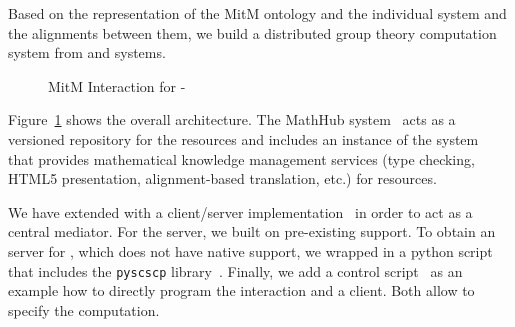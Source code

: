 Based on the \OMMT representation of the MitM ontology and the individual system and the alignments between them, we build a distributed group theory computation system from \GAP and \Singular systems.

\begin{figure}[ht]\centering
  \caption{MitM Interaction for \GAP-\Singular}\label{fig:mitmpoc}
\end{figure}

Figure~\ref{fig:mitmpoc} shows the overall architecture. The MathHub
system~\cite{IanJucKoh:sdm14,MathHub:on} acts as a versioned repository for the \OMMT
resources and includes an instance of the \MMT system~\cite{Rabe:MAGMS13} that provides
mathematical knowledge management services (type checking, HTML5 presentation,
alignment-based translation, etc.) for \OMMT resources.

We have extended \MMT with a \SCSCP client/server implementation~\cite{twiesing:msc17} in order to act as a central mediator.
For the \GAP server, we built on pre-existing \SCSCP support.
To obtain an \SCSCP server for \Singular, which does not have native \SCSCP support, we wrapped \Singular in a python script that includes the \lstinline|pyscscp| library~\cite{py-scscp:on}.
Finally, we add a \Python control script~\cite{MitM-PoC} as an example how to directly program the interaction and a \Sage client.
Both allow to specify the computation.

